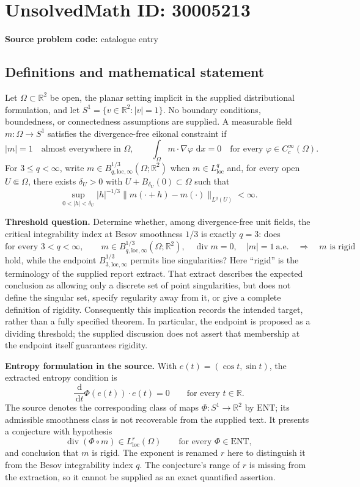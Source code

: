 \documentclass[11pt]{article}
\newcommand{\R}{\mathbb{R}}
\newcommand{\dd}{\,\mathrm{d}}
\begin{document}
\section*{UnsolvedMath ID: 30005213}
\textbf{Source problem code:} catalogue entry
\subsection{Definitions and mathematical statement}
Let \(\Omega\subset\R^2\) be open, the planar setting implicit in the supplied distributional formulation, and let \(S^1=\{v\in\R^2:|v|=1\}\). No boundary conditions, boundedness, or connectedness assumptions are supplied. A measurable field \(m:\Omega\to S^1\) satisfies the divergence-free eikonal constraint if
\[
|m|=1\quad\text{almost everywhere in }\Omega,
\qquad
\int_\Omega m\cdot\nabla\varphi\,\dd x=0
\quad\text{for every }\varphi\in C_c^\infty(\Omega).
\]
For \(3\le q<\infty\), write \(m\in B^{1/3}_{q,\mathrm{loc},\infty}(\Omega;\R^2)\) when \(m\in L^q_{\mathrm{loc}}\) and, for every open \(U\Subset\Omega\), there exists \(\delta_U>0\) with \(U+B_{\delta_U}(0)\subset\Omega\) such that
\[
\sup_{0<|h|<\delta_U}|h|^{-1/3}
\|m(\cdot+h)-m(\cdot)\|_{L^q(U)}<\infty.
\]

\textbf{Threshold question.} Determine whether, among divergence-free unit fields, the critical integrability index at Besov smoothness \(1/3\) is exactly \(q=3\): does
\[
\text{for every }3<q<\infty,\qquad
m\in B^{1/3}_{q,\mathrm{loc},\infty}(\Omega;\R^2),
\quad \operatorname{div}m=0,
\quad |m|=1\ \text{a.e.}
\quad\Longrightarrow\quad
m\text{ is rigid}
\]
hold, while the endpoint \(B^{1/3}_{3,\mathrm{loc},\infty}\) permits line singularities? Here ``rigid'' is the terminology of the supplied report extract. That extract describes the expected conclusion as allowing only a discrete set of point singularities, but does not define the singular set, specify regularity away from it, or give a complete definition of rigidity. Consequently this implication records the intended target, rather than a fully specified theorem. In particular, the endpoint is proposed as a dividing threshold; the supplied discussion does not assert that membership at the endpoint itself guarantees rigidity.

\textbf{Entropy formulation in the source.} With \(e(t)=(\cos t,\sin t)\), the extracted entropy condition is
\[
\frac{\dd}{\dd t}\Phi(e(t))\cdot e(t)=0
\qquad\text{for every }t\in\R.
\]
The source denotes the corresponding class of maps \(\Phi:S^1\to\R^2\) by \(\mathrm{ENT}\); its admissible smoothness class is not recoverable from the supplied text. It presents a conjecture with hypothesis
\[
\operatorname{div}(\Phi\circ m)\in L^r_{\mathrm{loc}}(\Omega)
\qquad\text{for every }\Phi\in\mathrm{ENT},
\]
and conclusion that \(m\) is rigid. The exponent is renamed \(r\) here to distinguish it from the Besov integrability index \(q\). The conjecture's range of \(r\) is missing from the extraction, so it cannot be supplied as an exact quantified assertion.
\end{document}
